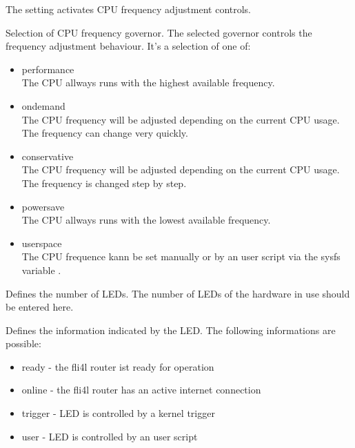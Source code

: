 \begin{description}
  The setting  activates CPU frequency adjustment controls.

  Selection of CPU frequency governor. The selected governor controls the frequency
  adjustment behaviour. It's a selection of one of: 

  \begin{itemize}
    \item performance\\
      The CPU allways runs with the highest available frequency.
    \item ondemand\\
      The CPU frequency will be adjusted depending on the current CPU usage.
      The frequency can change very quickly. 
    \item conservative\\
      The CPU frequency will be adjusted depending on the current CPU usage.
      The frequency is changed step by step. 
    \item powersave\\
      The CPU allways runs with the lowest available frequency.
    \item userspace\\
      The CPU frequence kann be set manually or by an user script via the
      sysfs variable .
  \end{itemize}

  Defines the number of LEDs. The number of LEDs of the hardware in use
  should be entered here.

  Defines the information indicated by the LED.
  The following informations are possible:
  \begin{itemize}
    \item ready - the fli4l router ist ready for operation\footnotemark
    \item online - the fli4l router has an active internet connection
    \item trigger - LED is controlled by a kernel trigger
    \item user - LED is controlled by an user script
  \end{itemize}



\end{description}
